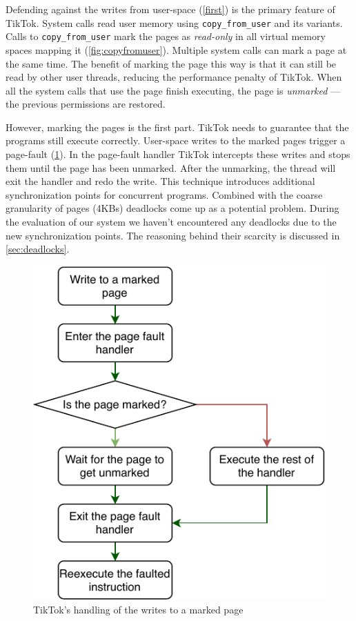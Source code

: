 Defending against the writes from user-space (\cref{first}) is the primary
feature of TikTok. System calls read user memory using \texttt{copy\_from\_user}
and its variants. Calls to \texttt{copy\_from\_user} mark the pages as
\emph{read-only} in all virtual memory spaces mapping it (\cref{fig:copyfromuser}). Multiple system
calls can mark a page at the same time. The benefit of marking the page this way
is that it can still be read by other user threads, reducing the performance
penalty of TikTok. When all the system calls that use the page finish executing,
the page is \emph{unmarked} --- the previous permissions are restored.

However, marking the pages is the first part. TikTok needs to guarantee that the
programs still execute correctly. User-space writes to the marked pages trigger
a page-fault (\cref{fig:pagefault}). In the page-fault handler TikTok intercepts
these writes and stops them until the page has been unmarked. After the
unmarking, the thread will exit the handler and redo the write. This technique
introduces additional synchronization points for concurrent programs. Combined
with the coarse granularity of pages (4KBs) deadlocks come up as a potential
problem. During the evaluation of our system we haven't encountered any
deadlocks due to the new synchronization points. The reasoning behind their
scarcity is discussed in \cref{sec:deadlocks}.

\begin{figure}[]
  \centering
  \includegraphics[width = .75 \linewidth]{img/pagefault.pdf}
  \caption{TikTok's handling of the writes to a marked page}
  \label{fig:pagefault}
\end{figure}

